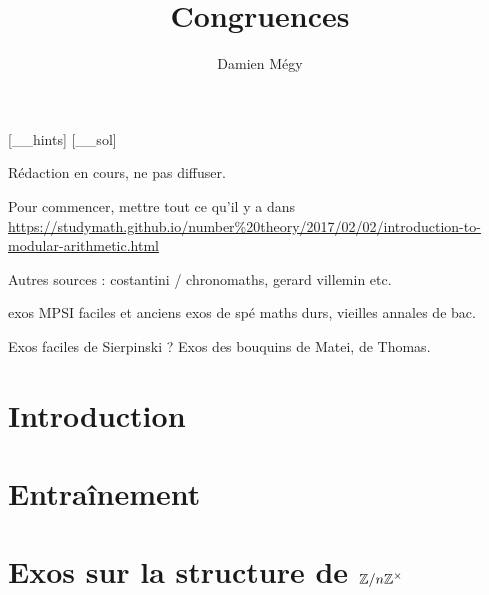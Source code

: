 





[_\jobname_hints]
[_\jobname_sol]


\title{Congruences}
\author{Damien Mégy}
\maketitle

Rédaction en cours, ne pas diffuser.

Pour commencer, mettre tout ce qu'il y a dans \url{https://studymath.github.io/number%20theory/2017/02/02/introduction-to-modular-arithmetic.html}

Autres sources : costantini / chronomaths, gerard villemin etc.

exos MPSI faciles et anciens exos de spé maths durs, vieilles annales de bac.

Exos faciles de Sierpinski ? Exos des bouquins de Matei, de Thomas.

\section{Introduction}

\section{Entraînement}

\section{Exos sur la structure de $\mathbb Z/n\mathbb Z^\times$}



\indications
\correction



